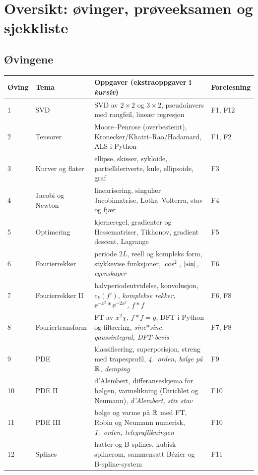 \section{Oversikt: øvinger, prøveeksamen og sjekkliste}

\subsection{Øvingene}
\begin{center}
\small
\begin{tabularx}{\textwidth}{@{}l l X l@{}}
\toprule
Øving & Tema & Oppgaver (ekstraoppgaver i \emph{kursiv}) & Forelesning\\
\midrule
1 & SVD & SVD av $2\times2$ og $3\times2$, pseudoinvers med rangfeil, lineær regresjon & F1, F12\\
2 & Tensorer & Moore--Penrose (overbestemt), Kronecker/Khatri--Rao/Hadamard, ALS i Python & F1, F2\\
3 & Kurver og flater & ellipse, skisser, sykloide, partiellderiverte, kule, ellipsoide, graf & F3\\
4 & Jacobi og Newton & linearisering, singulær Jacobimatrise, Lotka--Volterra, stav og fjær & F4\\
5 & Optimering & kjerneregel, gradienter og Hessematriser, Tikhonov, gradient descent, Lagrange & F5\\
6 & Fourierrekker & periode $2L$, reell og kompleks form, stykkevise funksjoner, \emph{$\cos^2$, $\lvert \sin\rvert$, egenskaper} & F6\\
7 & Fourierrekker II & halvperiodeutvidelse, konvolusjon, $c_k(f')$, \emph{komplekse rekker, $\ee^{-x^2}*\ee^{-2x^2}$, $f*f$} & F6, F8\\
8 & Fouriertransform & FT av $x^2\chi$, $f*f=g$, DFT i Python og filtrering, \emph{sinc$*$sinc, gaussintegral, DFT-bevis} & F7, F8\\
9 & PDE & klassifisering, superposisjon, streng med trapesprofil, \emph{4.\ orden, bølge på $\mathbb{R}$, demping} & F9\\
10 & PDE II & d'Alembert, differanseskjema for bølgen, varmelikning (Dirichlet og Neumann), \emph{d'Alembert, stiv stav} & F10\\
11 & PDE III & bølge og varme på $\mathbb{R}$ med FT, Robin og Neumann numerisk, \emph{1.\ orden, telegraflikningen} & F10\\
12 & Splines & hatter og B-splines, kubisk splinerom, sammensatt Bézier og B-spline-system & F11\\
\bottomrule
\end{tabularx}
\end{center}

